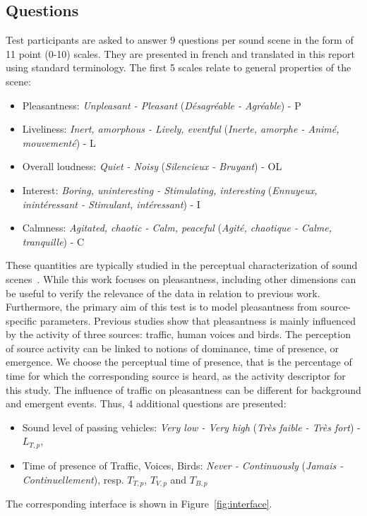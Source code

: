 \documentclass[11pt,a4paper]{article}
\begin{document}
\subsection{Questions}
\label{sec:test_questions}

Test participants are asked to answer 9 questions per sound scene in the form of 11 point (0-10) scales. They are presented in french and translated in this report using standard terminology. The first 5 scales relate to general properties of the scene:
\begin{itemize}
\item Pleasantness: \textit{Unpleasant - Pleasant} (\textit{D\'esagr\'eable - Agr\'eable}) - P
\item Liveliness: \textit{Inert, amorphous - Lively, eventful} (\textit{Inerte, amorphe - Anim\'e, mouvement\'e}) - L
\item Overall loudness: \textit{Quiet - Noisy} (\textit{Silencieux - Bruyant}) - OL
\item Interest: \textit{Boring, uninteresting - Stimulating, interesting} (\textit{Ennuyeux, inint\'eressant - Stimulant, int\'eressant}) - I
\item Calmness: \textit{Agitated, chaotic - Calm, peaceful} (\textit{Agit\'e, chaotique - Calme, tranquille}) - C
\end{itemize}
These quantities are typically studied in the perceptual characterization of sound scenes~\cite{axelsson2010, aumond2017, nilsson2007}. While this work focuses on pleasantness, including other dimensions can be useful to verify the relevance of the data in relation to previous work.\\
Furthermore, the primary aim of this test is to model pleasantness from source-specific parameters. Previous studies show that pleasantness is mainly influenced by the activity of three sources: traffic, human voices and birds. The perception of source activity can be linked to notions of dominance, time of presence,  or emergence. We choose the perceptual time of presence, that is the percentage of time for which the corresponding source is heard, as the activity descriptor for this study. The influence of traffic on pleasantness can be different for background and emergent events. Thus, 4 additional questions are presented:
\begin{itemize}
\item Sound level of passing vehicles: \textit{Very low - Very high} (\textit{Tr\`es faible - Tr\`es fort}) - $L_{T, p}$,
\item Time of presence of Traffic, Voices, Birds: \textit{Never - Continuously} (\textit{Jamais - Continuellement}), resp. $T_{T, p}$, $T_{V, p}$ and $T_{B, p}$
\end{itemize}
The corresponding interface is shown in Figure~\ref{fig:interface}.
\end{document}
